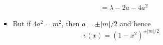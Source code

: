 \documentclass[../finalProject.tex]{subfiles}
\begin{document}
\begin{itemize}
\begin{itemize}
\begin{itemize}
\begin{align*}
                &= \lambda-2a-4a^2
            \end{align*}
            \item But if $4a^2=m^2$, then $a=\pm|m|/2$ and hence
            \begin{equation*}
                v(x) = (1-x^2)^{\pm|m|/2}
            \end{equation*}
        \end{itemize}

\end{itemize}
\end{itemize}
\end{document}
